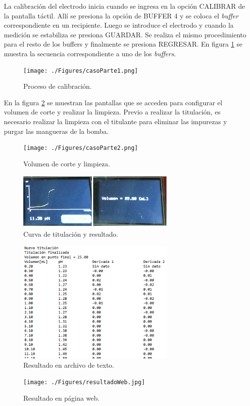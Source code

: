 La calibración del electrodo inicia cuando se ingresa en la opción CALIBRAR de la pantalla táctil. Allí se presiona la opción de BUFFER 4 y se coloca el \textit{buffer} correspondiente en un recipiente. Luego se introduce el electrodo y cuando la medición se estabiliza se presiona GUARDAR. Se realiza el mismo procedimiento para el resto de los buffers y finalmente se presiona REGRESAR. En figura \ref{fig:casoParte1} se muestra la secuencia correspondiente a uno de los \textit{buffers}.

\begin{figure}[htbp]
	\centering
	\texttt{[image: ./Figures/casoParte1.png]}
	\caption{Proceso de calibración.}
	\label{fig:casoParte1}
\end{figure}

En la figura \ref{fig:casoParte2} se muestran las pantallas que se acceden para configurar el volumen de corte y realizar la limpieza. Previo a realizar la titulación, es necesario realizar la limpieza con el titulante para eliminar las impurezas y purgar las mangueras de la bomba.

\begin{figure}[htbp]
	\centering
	\texttt{[image: ./Figures/casoParte2.png]}
	\caption{Volumen de corte y limpieza.}
	\label{fig:casoParte2}
\end{figure}



\begin{figure}[htbp]
	\centering
	\includegraphics[width=0.7\textwidth]{./Figures/casoParte3.png}
	\caption{Curva de titulación y resultado.}
	\label{fig:casoParte3}
\end{figure}


\begin{figure}[htbp]
	\centering
	\includegraphics[width=0.7\textwidth]{./Figures/resultadoSD.png}
	\caption{Resultado en archivo de texto.}
	\label{fig:resultadoSD}
\end{figure}

\begin{figure}[htbp]
	\centering
	\texttt{[image: ./Figures/resultadoWeb.jpg]}
	\caption{Resultado en página web.}
	\label{fig:resultadoWeb.jpg}
\end{figure}
